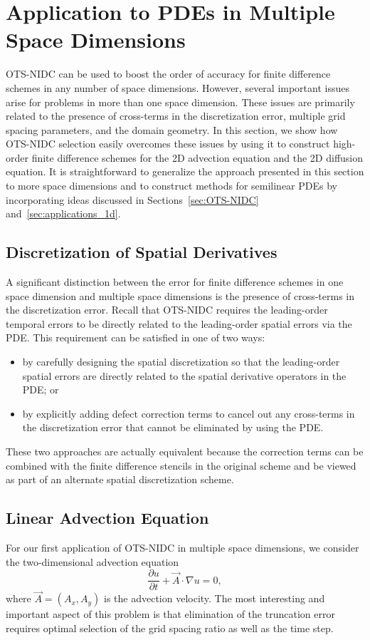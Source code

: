 \documentclass[fleqn,12pt,twoside]{article}
\newcommand{\beq}{\begin{equation}}
\newcommand{\eeq}{\end{equation}}
\begin{document}
\section{\label{sec:applications_multidim}
         Application to PDEs in Multiple Space Dimensions}
OTS-NIDC can be used to boost the order of accuracy for finite difference 
schemes in any number of space dimensions.  However, several important issues 
arise for problems in more than one space dimension.  These issues are 
primarily related to the presence of cross-terms in the discretization error, 
multiple grid spacing parameters,  and the domain geometry.  In this section, 
we show how OTS-NIDC selection easily overcomes these issues by using it to 
construct high-order finite difference schemes for the 2D advection equation 
and the 2D diffusion equation.  
It is straightforward to generalize the approach presented in this section to 
more space dimensions and to construct methods for semilinear PDEs by 
incorporating ideas discussed in 
Sections~\ref{sec:OTS-NIDC} and~\ref{sec:applications_1d}.  


\subsection{\label{sec:ots_multidim_crossterms}
            Discretization of Spatial Derivatives}
A significant distinction between the error for finite difference schemes in 
one space dimension and multiple space dimensions is the presence of 
cross-terms in the discretization error.  Recall that OTS-NIDC requires the
leading-order temporal errors to be directly related to the leading-order
spatial errors via the PDE.  This requirement can be satisfied in one of two
ways:
\begin{itemize}
\item by carefully designing the spatial discretization so that the
      leading-order spatial errors are directly related to the spatial 
      derivative operators in the PDE; or
\item by explicitly adding defect correction terms to cancel out any 
      cross-terms in the discretization error that cannot be eliminated 
      by using the PDE.
\end{itemize}
These two approaches are actually equivalent because the correction terms 
can be combined with the finite difference stencils in the original scheme 
and be viewed as part of an alternate spatial discretization scheme. 


\subsection{Linear Advection Equation}
For our first application of OTS-NIDC in multiple space dimensions, we 
consider the two-dimensional advection equation
\beq
  \frac{\partial u}{\partial t} + \vec{A} \cdot \nabla u = 0,
  \label{eq:advection_eqn_2d}
\eeq
where $\vec{A} = (A_x, A_y)$ is the advection velocity.  
The most interesting and important aspect of this problem is that elimination 
of the truncation error requires optimal selection of the grid spacing ratio 
as well as the time step.  
\end{document}
